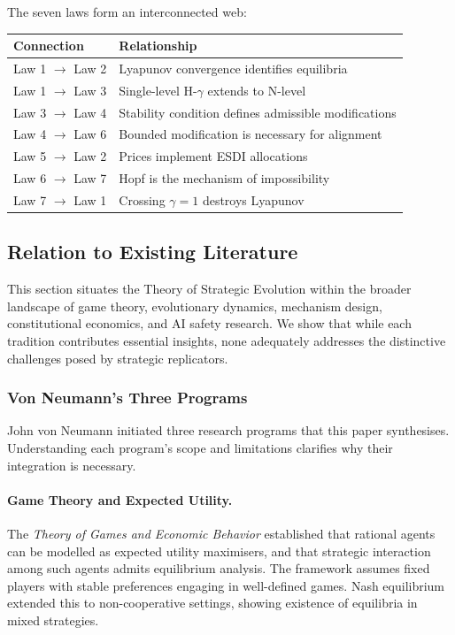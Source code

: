 \documentclass[12pt]{article}
\begin{document}
The seven laws form an interconnected web:

\begin{center}
\begin{tabular}{ll}
\toprule
\textbf{Connection} & \textbf{Relationship} \\
\midrule
Law 1 $\to$ Law 2 & Lyapunov convergence identifies equilibria \\
Law 1 $\to$ Law 3 & Single-level H-$\gamma$ extends to N-level \\
Law 3 $\to$ Law 4 & Stability condition defines admissible modifications \\
Law 4 $\to$ Law 6 & Bounded modification is necessary for alignment \\
Law 5 $\to$ Law 2 & Prices implement ESDI allocations \\
Law 6 $\to$ Law 7 & Hopf is the mechanism of impossibility \\
Law 7 $\to$ Law 1 & Crossing $\gamma = 1$ destroys Lyapunov \\
\bottomrule
\end{tabular}
\end{center}


\subsection{Relation to Existing Literature}

This section situates the Theory of Strategic Evolution within the broader landscape of game theory, evolutionary dynamics, mechanism design, constitutional economics, and AI safety research. We show that while each tradition contributes essential insights, none adequately addresses the distinctive challenges posed by strategic replicators.

\subsubsection{Von Neumann's Three Programs}

John von Neumann initiated three research programs that this paper synthesises. Understanding each program's scope and limitations clarifies why their integration is necessary.

\paragraph{Game Theory and Expected Utility.}
The \emph{Theory of Games and Economic Behavior} \citep{vonneumann1944} established that rational agents can be modelled as expected utility maximisers, and that strategic interaction among such agents admits equilibrium analysis. The framework assumes fixed players with stable preferences engaging in well-defined games. Nash equilibrium \citep{nash1950} extended this to non-cooperative settings, showing existence of equilibria in mixed strategies.
\end{document}

